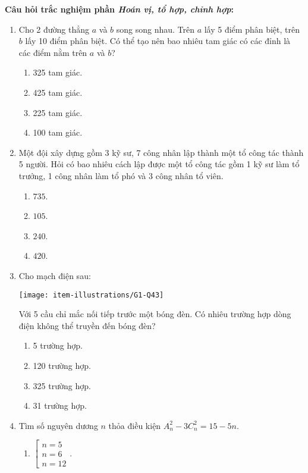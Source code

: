 \noindent\textbf{Câu hỏi trắc nghiệm phần \textit{Hoán vị, tổ hợp, chỉnh hợp}:}\par
\begin{enumerate}[label=\textbf{Câu \arabic*.},align=left,left=0cm..0cm,itemindent=*]
	\item Cho 2 đường thẳng $a$ và $b$ song song nhau. Trên $a$ lấy 5 điểm phân biệt, trên $b$ lấy 10 điểm phân biệt. Có thể tạo nên bao nhiêu tam giác có các đỉnh là các điểm nằm trên $a$ và $b$?
	\begin{enumerate}[label=\textbf{\Alph*.},align=left,left=1cm..0cm,itemindent=*]
		\item 325 tam giác. \item 425 tam giác. \item 225 tam giác. \item 100 tam giác.
	\end{enumerate}
	\item Một đội xây dựng gồm 3 kỹ sư, 7 công nhân lập thành một tổ công tác thành 5 người. Hỏi có bao nhiêu cách lập được một tổ công tác gồm 1 kỹ sư làm tổ trưởng, 1 công nhân làm tổ phó và 3 công nhân tổ viên.
	\begin{enumerate}[label=\textbf{\Alph*.},align=left,left=1cm..0cm,itemindent=*]
		\item $735$. \item $105$. \item $240$. \item $420$.
	\end{enumerate}
	\item Cho mạch điện sau:\par
	{\centering\texttt{[image: item-illustrations/G1-Q43]}\par}
	Với 5 cầu chỉ mắc nối tiếp trước một bóng đèn. Có nhiêu trường hợp dòng điện không thể truyền đến bóng đèn?
	\begin{enumerate}[label=\textbf{\Alph*.},align=left,left=1cm..0cm,itemindent=*]
		\item 5 trường hợp. \item 120 trường hợp. \item 325 trường hợp. \item 31 trường hợp.
	\end{enumerate}
	\item Tìm số nguyên dương $n$ thỏa điều kiện $A_{n}^{2}-3C_{n}^{2}=15-5n$.
	\begin{enumerate}[label=\textbf{\Alph*.},align=left,left=1cm..0cm,itemindent=*]
		\item $\left[ \begin{array}{l} n=5\\ n=6\\ n=12 \end{array} \right.$.

\end{enumerate}
\end{enumerate}
